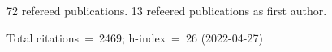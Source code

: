 72 refereed publications. 13 refeered publications as first author.

Total citations~=~2469; h-index~=~26 (2022-04-27)